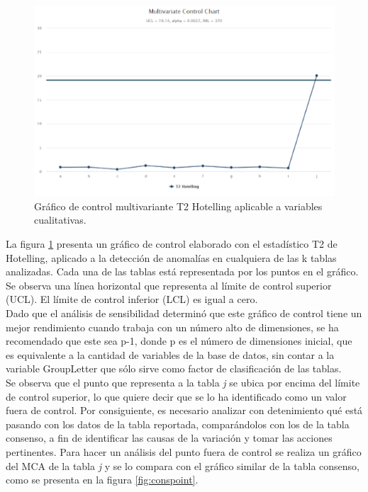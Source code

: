 \documentclass[water,article,submit,moreauthors,pdftex]{mdpi}
\begin{document}
\begin{figure}[!ht]



\begin{center}\includegraphics[width=0.6\linewidth,]{Hot1} \end{center}

\caption{Gráfico de control multivariante T2 Hotelling aplicable a variables cualitativas.}

\label{fig:hot1}
\end{figure}

La figura \ref{fig:hot1} presenta un gráfico de control elaborado con el
estadístico T2 de Hotelling, aplicado a la detección de anomalías en
cualquiera de las k tablas analizadas. Cada una de las tablas está
representada por los puntos en el gráfico. Se observa una línea
horizontal que representa al límite de control superior (UCL). El límite
de control inferior (LCL) es igual a cero.\\
Dado que el análisis de sensibilidad determinó que este gráfico de
control tiene un mejor rendimiento cuando trabaja con un número alto de
dimensiones, se ha recomendado que este sea p-1, donde p es el número de
dimensiones inicial, que es equivalente a la cantidad de variables de la
base de datos, sin contar a la variable GroupLetter que sólo sirve como
factor de clasificación de las tablas.\\
Se observa que el punto que representa a la tabla \emph{j} se ubica por
encima del límite de control superior, lo que quiere decir que se lo ha
identificado como un valor fuera de control. Por consiguiente, es
necesario analizar con detenimiento qué está pasando con los datos de la
tabla reportada, comparándolos con los de la tabla consenso, a fin de
identificar las causas de la variación y tomar las acciones pertinentes.
Para hacer un análisis del punto fuera de control se realiza un gráfico
del MCA de la tabla \emph{j} y se lo compara con el gráfico similar de
la tabla consenso, como se presenta en la figura \ref{fig:conspoint}.
\end{document}
